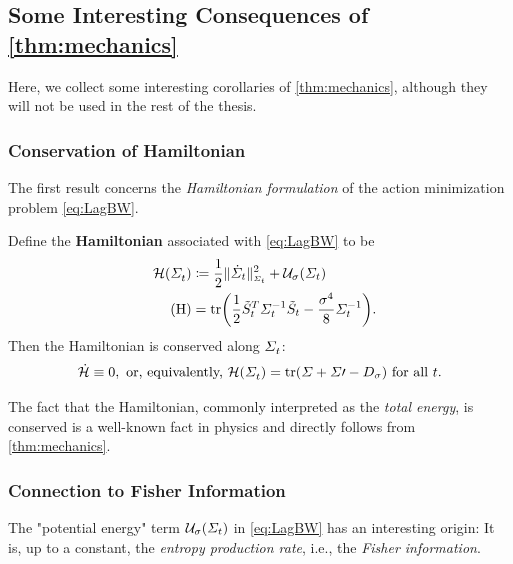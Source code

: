 \subsection{Some Interesting Consequences of \cref{thm:mechanics}}
\label{sec:interesting}

Here, we collect some interesting corollaries of \cref{thm:mechanics}, although they will not be used in the rest of the thesis.

\subsubsection{Conservation of Hamiltonian}
The first result concerns the \emph{Hamiltonian formulation} of the action minimization problem \eqref{eq:LagBW}. 
 
\newcommand{\hambase}{ \mathcal{H} }
\newcommand{\ham}[1][\Sigmasol]{ \hambase\parens*{#1} }

\begin{corollary}
Define the \textbf{Hamiltonian} associated with \eqref{eq:LagBW} to be
\begin{align}
\nn
\ham &\defeq \kenergyBW + \penergyBW \\
\label{eq:HamBW}
\tag{H}
&=  \tr  \parens*{\frac{1}{2} \Ht^T \Sigmasolinv\Ht - \frac{\sdev^4}{8} \Sigmasolinv}.
\end{align}Then the Hamiltonian is conserved along $\Sigma^{}_{ t }$: 
\begin{align}
\dot{\hambase} \equiv 0,  \text{ or, equivalently, }  \ham = \tr \parens*{\Sigma + \Sigma\prime - \D} \textup{ for all $\ctime$.}
\end{align}
\end{corollary}

The fact that the Hamiltonian, commonly interpreted as the \emph{total energy}, is conserved is a well-known fact in physics \citep{villani2009optimal} and directly follows from \cref{thm:mechanics}.

\subsubsection{Connection to Fisher Information}

The "potential energy" term $\penergyBW$ in \eqref{eq:LagBW} has an interesting origin: It is, up to a constant, the \emph{entropy production rate}, i.e., the \emph{Fisher information}.


